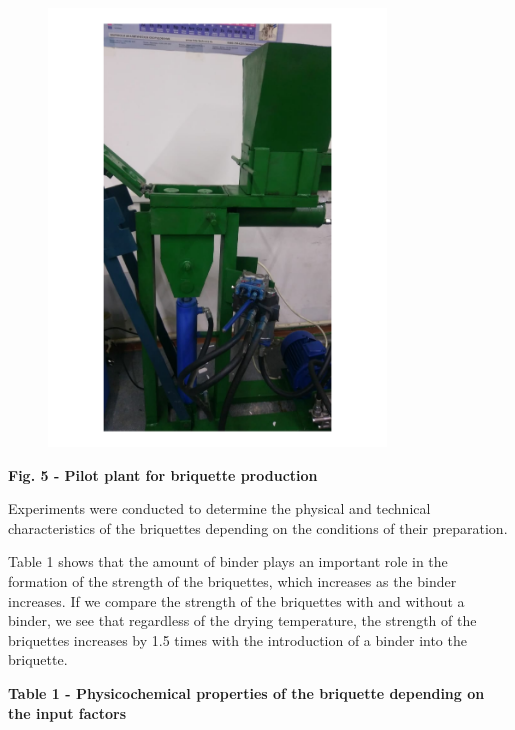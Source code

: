 \begin{figure}[H]
	\centering
	\includegraphics[width=0.8\textwidth]{media/gorn2/image7}
	\caption*{}
\end{figure}


{\bfseries Fig. 5 - Pilot plant for briquette production}

Experiments were conducted to determine the physical and technical
characteristics of the briquettes depending on the conditions of their
preparation.

Table 1 shows that the amount of binder plays an important role in the
formation of the strength of the briquettes, which increases as the
binder increases. If we compare the strength of the briquettes with and
without a binder, we see that regardless of the drying temperature, the
strength of the briquettes increases by 1.5 times with the introduction
of a binder into the briquette.

{\bfseries Table 1 - Physicochemical properties of the briquette depending
on the input factors}

